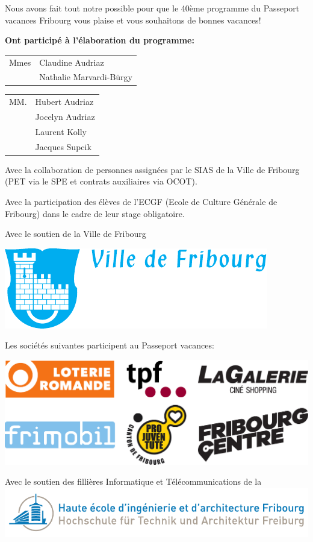 \cleardoublepage
Nous avons fait tout notre possible pour que le 40ème programme du Passeport vacances Fribourg vous plaise et vous souhaitons de bonnes vacances!
	
\textbf{Ont participé à l'élaboration du programme:}

\begin{tabular}{p{1.6cm} l}
Mmes & Claudine Audriaz \\
& Nathalie Marvardi-Bürgy \\
\end{tabular}

\begin{tabular}{p{1.6cm} l}
	MM. & Hubert Audriaz \\
	& Jocelyn Audriaz \\
	& Laurent Kolly \\
	& Jacques Supcik \\
\end{tabular}

Avec la collaboration de personnes assignées par le SIAS de la Ville de Fribourg (PET via le SPE et contrats auxiliaires via OCOT). 

Avec la participation des élèves de l'ECGF (Ecole de Culture Générale de Fribourg) dans le cadre de leur stage obligatoire.

{\centering
	{\LARGE Avec le soutien de la Ville de Fribourg}
	
	\includegraphics[width=.4\textwidth]{fig/ville.pdf}
	\vfill
	\par

	{\LARGE Les sociétés suivantes participent au Passeport vacances:}
	
	\includegraphics[width=.8\textwidth]{fig/pub0.pdf}
	\vfill
	\par
	
	{\LARGE Avec le soutien des fillières Informatique et Télécommunications de la}
	\includegraphics[width=.8\textwidth]{fig/heiafr.pdf}
	\par
}

